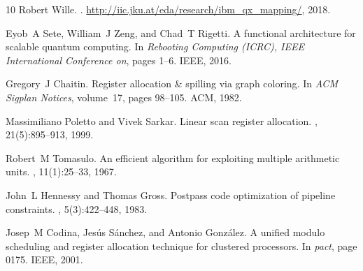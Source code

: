 \documentclass[journal,10pt,twocolumn]{IEEEtran}
\begin{document}
\begin{thebibliography}{10}
{Robert Wille}.
.
\newblock \url{http://iic.jku.at/eda/research/ibm_qx_mapping/}, 2018.

Eyob~A Sete, William~J Zeng, and Chad~T Rigetti.
\newblock A functional architecture for scalable quantum computing.
\newblock In {\em Rebooting Computing (ICRC), IEEE International Conference
  on}, pages 1--6. IEEE, 2016.

Gregory~J Chaitin.
\newblock Register allocation \& spilling via graph coloring.
\newblock In {\em ACM Sigplan Notices}, volume~17, pages 98--105. ACM, 1982.

Massimiliano Poletto and Vivek Sarkar.
\newblock Linear scan register allocation.
,
  21(5):895--913, 1999.

Robert~M Tomasulo.
\newblock An efficient algorithm for exploiting multiple arithmetic units.
, 11(1):25--33, 1967.

John~L Hennessy and Thomas Gross.
\newblock Postpass code optimization of pipeline constraints.
,
  5(3):422--448, 1983.

Josep~M Codina, Jes{\'u}s S{\'a}nchez, and Antonio Gonz{\'a}lez.
\newblock A unified modulo scheduling and register allocation technique for
  clustered processors.
\newblock In {\em pact}, page 0175. IEEE, 2001.

\end{thebibliography}
\end{document}
